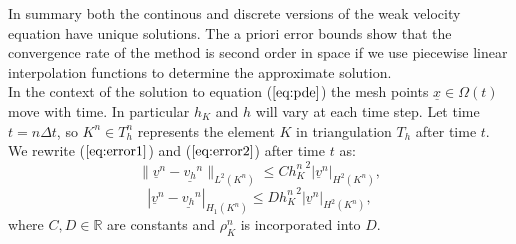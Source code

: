 \documentclass[11pt]{article}
\newcommand{\D}{\Delta}
\newcommand{\ul}{\underline}
\newcommand{\Om}{\Omega}
\begin{document}
In summary both the continous and discrete versions of the weak velocity equation have unique solutions. The a priori error bounds show that the convergence rate of the method is second order in space if we use piecewise linear interpolation functions to determine the approximate solution. \\
In the context of the solution to equation ($\ref{eq:pde}$) the mesh points $\ul{x}\in \Om(t)$ move with time. In particular $h_K$ and $h$ will vary at each time step. Let time $t = n\D{t}$, so $K^n \in T_h^n$ represents the element $K$ in triangulation $T_h$ after time $t$. We rewrite ($\ref{eq:error1}$) and ($\ref{eq:error2}$) after time $t$ as:
\begin{equation}
\label{eq:error3_1}
\|\ul{v}^n-\ul{v_h}^n\|_{L^2(K^n)} \leq C{h_K^n}^2|\ul{v}^n|_{H^2(K^n)},
\end{equation}
\begin{equation}
\label{eq:error4_1}
|\ul{v}^n-\ul{v_h}^n|_{H_1(K^n)} \leq D{h_K^n}^2|\ul{v}^n|_{H^2(K^n)},
\end{equation}
where $C, D \in \mathbb{R}$ are constants and $\rho_K^n$ is incorporated into $D$.
\end{document}
